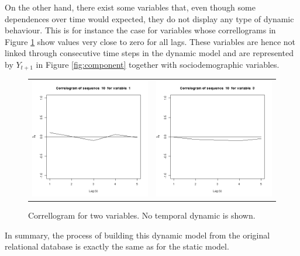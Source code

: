 On the other hand, there exist some variables that, even though some dependences over time would expected, they do not display any type of dynamic behaviour. This is for instance the case for variables whose correllograms in Figure \ref{fig:cajamarCorr} show values very close to zero for all lags. These variables are hence not linked through consecutive time steps in the dynamic model and are represented by $Y_{t+1}$ in Figure \ref{fig:component} together with sociodemographic variables.

\begin{figure}[h]
  \centering
    \begin{tabular}{cc}
    \includegraphics[width=70mm]{figures/CajaMarcrl1}&
     \includegraphics[width=70mm]{figures/CajaMarcrl3}\\
  \end{tabular}
    \caption{\label{fig:cajamarCorr}Correllogram for two variables. No temporal dynamic is shown.}
\end{figure}

In summary, the process of building this dynamic model from the original relational database 
is exactly the same as for the static model.

